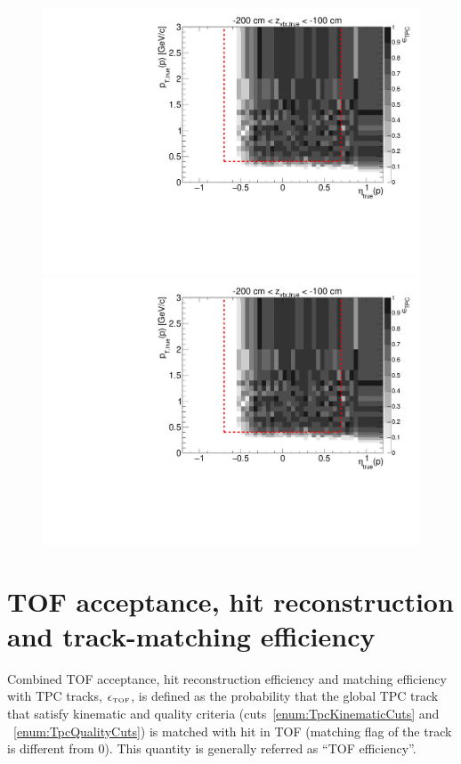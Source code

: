 \begin{figure}[hb]
{  \includegraphics[width=\linewidth,page=16]{graphics/eff/Eff2D_TPC_proton_Plus.pdf}\\
  \includegraphics[width=\linewidth,page=18]{graphics/eff/Eff2D_TPC_proton_Plus.pdf}
}%
\end{figure}



\section{TOF acceptance, hit reconstruction and track-matching efficiency}\label{sec:tofMatchEff}

Combined TOF acceptance, hit reconstruction efficiency and matching efficiency with TPC tracks, $\epsilon_{\textrm{\tiny TOF}}$, is defined as the probability that the global TPC track that satisfy kinematic and quality criteria (cuts~\ref{enum:TpcKinematicCuts} and ~\ref{enum:TpcQualityCuts}) is matched with hit in TOF (matching flag of the track is different from 0). This quantity is generally referred as ``TOF efficiency''.

